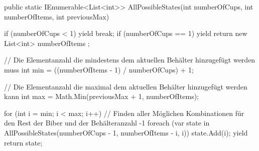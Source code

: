 \documentclass[a4paper,10pt,ngerman]{scrartcl}
\begin{document}
\begin{lstcs}
{    public static IEnumerable<List<int>> AllPossibleStates(int numberOfCups, int numberOfItems, int previousMax)
    {
        if (numberOfCups < 1) yield break;
        if (numberOfCups == 1) yield return new List<int> { numberOfItems };
    
        // Die Elementanzahl die mindestens dem aktuellen Behälter hinzugefügt werden muss
        int min = ((numberOfItems - 1) / numberOfCups) + 1;
    
        // Die Elementanzahl die maximal dem aktuellen Behälter hinzugefügt werden kann
        int max = Math.Min(previousMax + 1, numberOfItems);
    
        for (int i = min; i < max; i++)
        {
            // Finden aller Möglichen Kombinationen für den Rest der Biber und der Behälteranzahl -1
            foreach (var state in AllPossibleStates(numberOfCups - 1, numberOfItems - i, i))
            {
                state.Add(i);
                yield return state;
            }
        }
    }
}
\end{lstcs}
\end{document}
